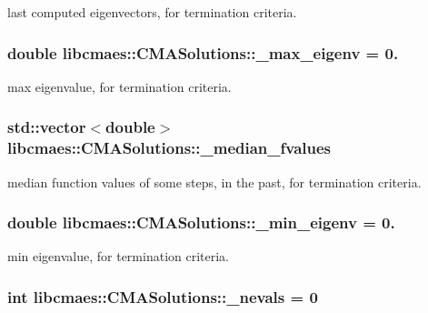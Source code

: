 last computed eigenvectors, for termination criteria. \hypertarget{classlibcmaes_1_1CMASolutions_a6ab80259b3184af4a3d1d762643be491}{
\subsubsection[{\-\_\-max\-\_\-eigenv}]{\setlength{\rightskip}{0pt plus 5cm}double libcmaes\-::\-C\-M\-A\-Solutions\-::\-\_\-max\-\_\-eigenv = 0.}}\label{classlibcmaes_1_1CMASolutions_a6ab80259b3184af4a3d1d762643be491}
max eigenvalue, for termination criteria. \hypertarget{classlibcmaes_1_1CMASolutions_aaa527a976c47c1b0d48b33fafa0a366f}{
\subsubsection[{\-\_\-median\-\_\-fvalues}]{\setlength{\rightskip}{0pt plus 5cm}std\-::vector$<$double$>$ libcmaes\-::\-C\-M\-A\-Solutions\-::\-\_\-median\-\_\-fvalues}}\label{classlibcmaes_1_1CMASolutions_aaa527a976c47c1b0d48b33fafa0a366f}
median function values of some steps, in the past, for termination criteria. \hypertarget{classlibcmaes_1_1CMASolutions_af504d5301c2609e71643aacd82c48742}{
\subsubsection[{\-\_\-min\-\_\-eigenv}]{\setlength{\rightskip}{0pt plus 5cm}double libcmaes\-::\-C\-M\-A\-Solutions\-::\-\_\-min\-\_\-eigenv = 0.}}\label{classlibcmaes_1_1CMASolutions_af504d5301c2609e71643aacd82c48742}
min eigenvalue, for termination criteria. \hypertarget{classlibcmaes_1_1CMASolutions_aac5e40c86e1338aa38b3ebbdf0541299}{
\subsubsection[{\-\_\-nevals}]{\setlength{\rightskip}{0pt plus 5cm}int libcmaes\-::\-C\-M\-A\-Solutions\-::\-\_\-nevals = 0}}\label{classlibcmaes_1_1CMASolutions_aac5e40c86e1338aa38b3ebbdf0541299}
